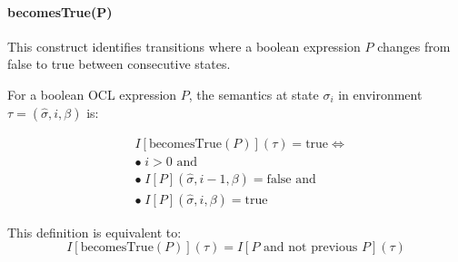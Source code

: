 \paragraph{becomesTrue(P)}
This construct identifies transitions where a boolean expression $P$ changes from 
false to true between consecutive states.

For a boolean OCL expression $P$, the semantics at state $\sigma_i$ in environment 
$\tau = (\hat{\sigma}, i, \beta)$ is:

\begin{equation}
    \begin{split}
    & I[\text{becomesTrue}(P)](\tau) = \text{true} \iff \\
    & \bullet\; i > 0 \text{ and} \\
    & \bullet\; I[P](\hat{\sigma}, i-1, \beta) = \text{false} \text{ and} \\
    & \bullet\; I[P](\hat{\sigma}, i, \beta) = \text{true}
    \end{split}
\end{equation}

This definition is equivalent to:
\begin{equation}
I[\text{becomesTrue}(P)](\tau) = I[P \text{ and not previous } P](\tau)
\end{equation}

